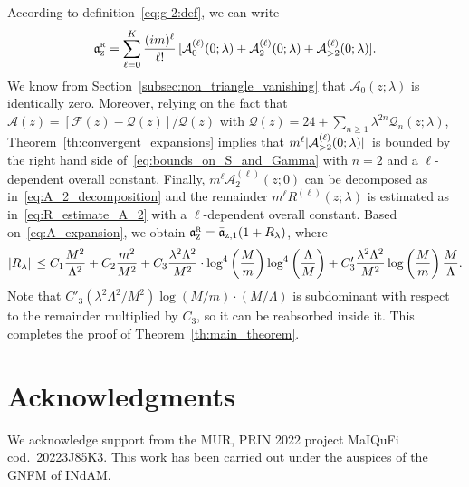 \documentclass[a4paper, 11pt]{article}
\newcommand{\gyr}{\mathfrak{a}}								%
\newcommand{\rgyr}{\gyr_\textsc{z}^\textsc{r}}
\newcommand{\cutoff}{\Lambda}								%
\theoremstyle{thm}
\begin{document}
According to definition~\eqref{eq:g-2:def}, we can write
\begin{equation}
\label{eq:holomorphic_estimate}
\rgyr = \sum_{\ell = 0}^K \frac{(im)^\ell}{\ell!} \, [\mathcal{A}^{(\ell)}_0(0; \lambda) + \mathcal{A}^{(\ell)}_2(0; \lambda) + \mathcal{A}^{(\ell)}_{>2}(0; \lambda)].
\end{equation}
We know from Section~\ref{subsec:non_triangle_vanishing} that $\mathcal{A}_0(z; \lambda)$ is identically zero. Moreover, relying on the fact that $\mathcal{A}(z) = [\mathcal{F}(z) - \mathcal{Q}(z)]/\mathcal{Q}(z)$ with $\mathcal{Q}(z) = 24 + \sum_{n \ge 1} \lambda^{2n} \mathcal{Q}_n(z; \lambda)$, Theorem~\ref{th:convergent_expansions} implies that $m^\ell \abs*{\mathcal{A}^{(\ell)}_{>2}(0; \lambda)}$ is bounded by the right hand side of~\eqref{eq:bounds_on_S_and_Gamma} with $n = 2$ and a $\ell$-dependent overall constant. Finally, $m^\ell \mathcal{A}^{(\ell)}_2(z; 0)$ can be decomposed as in~\eqref{eq:A_2_decomposition} and the remainder $m^\ell R^{(\ell)}(z; \lambda)$ is estimated as in~\eqref{eq:R_estimate_A_2} with a $\ell$-dependent overall constant. Based on~\eqref{eq:A_expansion}, we obtain $\rgyr = \bar{\gyr}_{\textsc{z}, 1}(1 + R_\lambda)$, where
\begin{equation}
\abs*{R_\lambda} \le C_1 \frac{M^2}{\cutoff^2} + C_2 \frac{m^2}{M^2} + C_3 \frac{\lambda^2\cutoff^2}{M^2} \cdot \log^4 \left(\frac{M}{m}\right) \log^4 \left( \frac{\cutoff}{M} \right) + C'_3 \frac{\lambda^2\cutoff^2}{M^2} \log \left( \frac{M}{m} \right) \frac{M}{\cutoff}.
\end{equation}
Note that $C'_3 (\lambda^2 \cutoff^2/M^2) \log (M/m) \cdot (M/\cutoff)$ is subdominant with respect to the remainder multiplied by $C_3$, so it can be reabsorbed inside it. This completes the proof of Theorem~\ref{th:main_theorem}.

\section*{Acknowledgments}

We acknowledge support from the MUR, PRIN 2022 project MaIQuFi cod.\ 20223J85K3. This work has been carried out under the auspices of the GNFM of INdAM.  

\appendix
\end{document}
